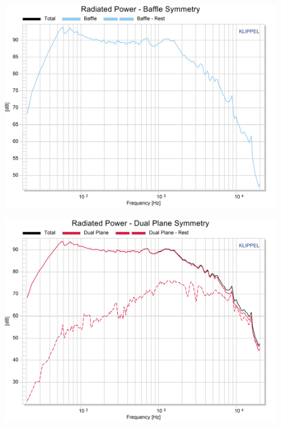 \documentclass{report}
\begin{document}
\begin{appendices}
\begin{minipage}{0.5\textwidth}
\begin{center}
	\includegraphics[width=0.9\textwidth]{Sym/Oval_RadPow_B}
    \captionsetup{hypcap=false}
\end{center}
\end{minipage}
\begin{minipage}{0.5\textwidth}
\begin{center}
	\includegraphics[width=0.9\textwidth]{Sym/Oval_RadPow_Dps}
    \captionsetup{hypcap=false}
\end{center}
\end{minipage}


\end{appendices}
\end{document}
